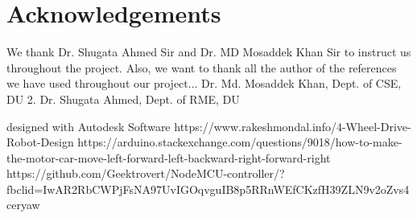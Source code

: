 \documentclass{Resources/UoBLab1}
\begin{document}
\section*{Acknowledgements}

We thank Dr. Shugata Ahmed Sir and Dr. MD Mosaddek Khan Sir to instruct us throughout the project. Also, we want to thank all the author of the references we have used throughout our project... Dr. Md. Mosaddek Khan, Dept. of CSE, DU
2. Dr. Shugata Ahmed, Dept. of RME, DU

\begin{thebibliography}{}

designed with Autodesk Software
https://www.rakeshmondal.info/4-Wheel-Drive-Robot-Design
https://arduino.stackexchange.com/questions/9018/how-to-make-the-motor-car-move-left-forward-left-backward-right-forward-right
https://github.com/Geektrovert/NodeMCU-controller/?fbclid=IwAR2RbCWPjFsNA97UvIGOqvguIB8p5RRnWEfCKzfH39ZLN9v2oZvs4ceryaw
\end{thebibliography}
\end{document}
